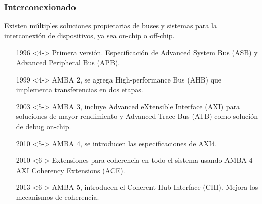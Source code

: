 \documentclass[aspectratio=169]{beamer}
\begin{document}
\begin{frame}[t,fragile]
    \frametitle{Interconexionado}
    \small
    Existen múltiples soluciones propietarias de buses y sistemas para la interconexión de dispositivos, ya sea on-chip o off-chip.
    \bigskip
    \begin{itemize}
    \setlength\itemsep{0.02cm}
    \item[1996]<4-> \small Primera versión. Especificación de Advanced System Bus (ASB) y Advanced Peripheral Bus (APB).
    \item[1999]<4-> \small AMBA 2, se agrega High-performance Bus (AHB) que implementa transferencias en dos etapas.
    \item[2003]<5-> \small AMBA 3, incluye Advanced eXtensible Interface (AXI) para soluciones de mayor rendimiento y Advanced Trace Bus (ATB) como solución de debug on-chip.
    \item[2010]<5-> \small AMBA 4, se introducen las especificaciones de AXI4.
    \item[2010]<6-> \small Extensiones para coherencia en todo el sistema usando AMBA 4 AXI Coherency Extensions (ACE).
    \item[2013]<6-> \small AMBA 5, introducen el Coherent Hub Interface (CHI). Mejora los mecanismos de coherencia.
    \end{itemize}
\end{frame}
\end{document}
